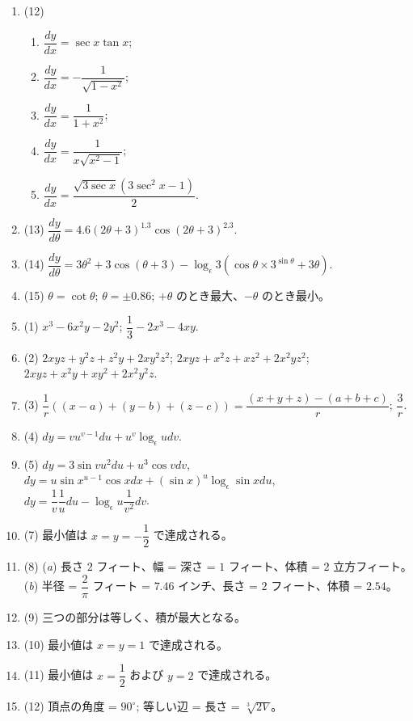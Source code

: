 \documentclass[a4paper,11pt,openany]{ltjsbook}
\begin{document}
\begin{enumerate}
\item (12) \begin{enumerate}[label=(\roman*)]
    \item $\dfrac{dy}{dx} = \sec x \tan x$;
    \item $\dfrac{dy}{dx} = - \dfrac{1}{\sqrt{1 - x^2}}$;
    \item $\dfrac{dy}{dx} = \dfrac{1}{1 + x^2}$;
    \item $\dfrac{dy}{dx} = \dfrac{1}{x \sqrt{x^2 - 1}}$;
    \item $\dfrac{dy}{dx} = \dfrac{\sqrt{3 \sec x} (3 \sec^2 x - 1)}{2}$.
\end{enumerate}

\item (13) $\dfrac{dy}{d\theta} = 4.6 (2\theta + 3)^{1.3} \cos (2\theta + 3)^{2.3}$.

\item (14) $\dfrac{dy}{d\theta} = 3\theta^2 + 3 \cos (\theta + 3) - \log_\epsilon 3 (\cos \theta \times 3^{\sin \theta} + 3\theta)$.

\item (15) $\theta = \cot \theta$; $\theta = \pm 0.86$; $+\theta$ のとき最大、$-\theta$ のとき最小。

\item (1) $x^3 - 6x^2 y - 2y^2$; $\dfrac{1}{3} - 2x^3 - 4xy$.

\item (2) $2xyz + y^2 z + z^2 y + 2xy^2 z^2$;
     $2xyz + x^2 z + xz^2 + 2x^2 yz^2$;
     $2xyz + x^2 y + xy^2 + 2x^2 y^2 z$.

\item (3) $\dfrac{1}{r} \left( (x - a) + (y - b) + (z - c) \right) = \dfrac{(x + y + z) - (a + b + c)}{r}$; $\dfrac{3}{r}$.

\item (4) $dy = vu^{v-1} du + u^v \log_\epsilon u dv$.

\item (5) $dy = 3 \sin v u^2 du + u^3 \cos v dv$,\\
     $dy = u \sin x^{u-1} \cos x dx + (\sin x)^u \log_\epsilon \sin x du$,\\
     $dy = \dfrac{1}{v} \dfrac{1}{u} du - \log_\epsilon u \dfrac{1}{v^2} dv$.

\item (7) 最小値は $x = y = -\dfrac{1}{2}$ で達成される。

\item (8) (\textit{a}) 長さ $2$ フィート、幅 = 深さ = $1$ フィート、体積 = $2$ 立方フィート。\\
     (\textit{b}) 半径 = $\dfrac{2}{\pi}$ フィート = $7.46$ インチ、長さ = $2$ フィート、体積 = $2.54$。

\item (9) 三つの部分は等しく、積が最大となる。

\item (10) 最小値は $x = y = 1$ で達成される。

\item (11) 最小値は $x = \dfrac{1}{2}$ および $y = 2$ で達成される。

\item (12) 頂点の角度 = $90^\circ$; 等しい辺 = 長さ = $\sqrt[3]{2V}$。
\end{enumerate}
\end{document}
